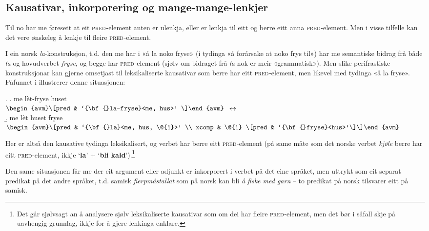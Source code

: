 \documentclass[12pt,a4paper,oneside,draft]{report}
\newcommand{\F}[2]{\textsc{#1}\ensuremath{_{#2}}}
\newcommand{\PRED}{\F{pred}{}}
\newcommand{\p}[1]{`\textbf{#1}'}
\begin{document}
\subsection{Kausativar, inkorporering og mange-mange-lenkjer}
\label{sec-3.6.5}

\label{SEC:f-mange-mange}

Til no har me føresett at eit \PRED{}-element anten er ulenkja, eller
er lenkja til eitt og berre eitt anna \PRED{}-element. Men i visse
tilfelle kan det vere ønskeleg å lenkje til fleire \PRED{}-element.

I ein norsk \emph{la}-konstruksjon, t.d. den me har i «å la noko fryse» (i
tydinga «å forårsake at noko frys til») har me semantiske bidrag frå
både \emph{la} og hovudverbet \emph{fryse}, og begge har \PRED{}-element (sjølv
om bidraget frå \emph{la} nok er meir «grammatisk»). Men slike
perifrastiske konstruksjonar kan gjerne omsetjast til leksikaliserte
kausativar som berre har eitt \PRED{}-element, men likevel med tydinga
«å la fryse». Påfunnet i \Next illustrerer denne situasjonen:

{\avmoptions{}
\ex. \a. me lèt-fryse huset \\
     $\begin{avm}\[pred & `{\bf{}la-fryse}<me, hus>' \]\end{avm}$
     $\\\\\leftrightarrow$\\
     \b. me lèt huset fryse \\
     $\begin{avm}\[pred & `{\bf{}la}<me, hus, \@{1}>' \\
     xcomp & \@{1} \[pred & `{\bf{}fryse}<hus>'\]\]\end{avm}$

}

Her er altså den kausative tydinga leksikalisert, og verbet har berre
 eitt \PRED{}-element (på same måte som det norske verbet \emph{kjøle}
 berre har eitt \PRED{}-element, ikkje \p{la} + \p{bli kald}).\footnote{Det går sjølvsagt an å analysere sjølv leksikaliserte
        kausativar som om dei har fleire \PRED{}-element, men det bør i
        såfall skje på uavhengig grunnlag, ikkje for å gjere lenkinga
        enklare. }

Den same situasjonen får me der eit argument eller adjunkt er
inkorporert i verbet på det eine språket, men uttrykt som eit separat
predikat på det andre språket, t.d. samisk \emph{fierpmástallat} som på
norsk kan bli \emph{å fiske med garn} -- to predikat på norsk tilsvarer eitt
på samisk.
\end{document}
